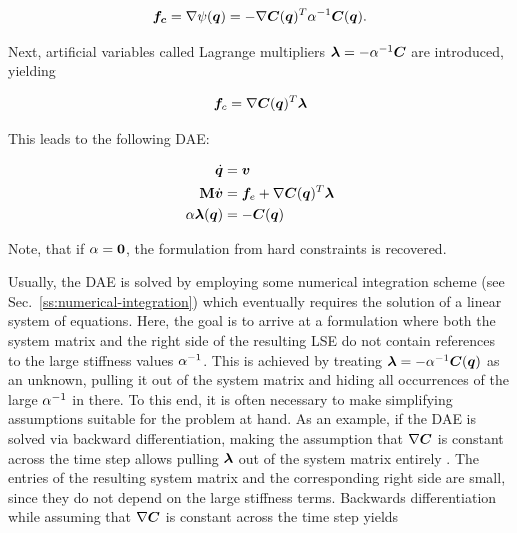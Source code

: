 \begin{equation}\label{eq:compliant-force}
    \bm{f_c} = \nabla \psi(\bm{q}) = -\nabla \bm{C}(\bm{q})^T\mathbf{\alpha}^{-1} \bm{C}(\bm{q}).
\end{equation}

\noindent Next, artificial variables called Lagrange multipliers $\bm{\lambda} = -\mathbf{\alpha}^{-1}\bm{C}$ are introduced, yielding 

\begin{equation}\label{eq:compliant-force-lambda}
    \bm{f}_c = \nabla \bm{C}(\bm{q})^T\bm{\lambda}
\end{equation}

\noindent This leads to the following DAE:

\begin{equation}\label{eq:compliant-dae}
\begin{split}
    \dot{\bm{q}} &= \bm{v} \\
    \mathbf{M}\dot{\bm{v}} &= \bm{f}_{e} + \nabla \bm{C}(\bm{q})^T\bm{\lambda} \\
    \mathbf{\alpha}\bm{\lambda}(\bm{q}) &= -\bm{C}(\bm{q})
\end{split}
\end{equation}

\noindent Note, that if $\mathbf{\alpha} = \mathbf{0}$, the formulation from hard constraints is recovered. 

Usually, the DAE is solved by employing some numerical integration scheme (see Sec.\ \ref{ss:numerical-integration}) which eventually requires 
the solution of a linear system of equations. Here, the goal is to arrive at a formulation where both the system matrix and the right 
side of the resulting LSE do not contain references to the large stiffness values
$\mathbf{\alpha}^{-1}$. This is achieved by treating $\bm{\lambda} = -\mathbf{\alpha}^{-1}\bm{C}(\bm{q})$ as an unknown, 
pulling it out of the system matrix and hiding all occurrences of the large $\mathbf{\alpha}^{-1}$ in there. To this end, it is often 
necessary to make simplifying assumptions suitable for the problem at hand. As an example, if the DAE is solved via backward 
differentiation, making the assumption that $\nabla \bm{C}$ is constant across the time step allows pulling $\bm{\lambda}$ out of 
the system matrix entirely \cite{tournier2015}. The entries of the resulting system matrix and the corresponding right side
are small, since they do not depend on the large stiffness terms. Backwards differentiation while assuming that $\nabla \bm{C}$ is 
constant across the time step yields


